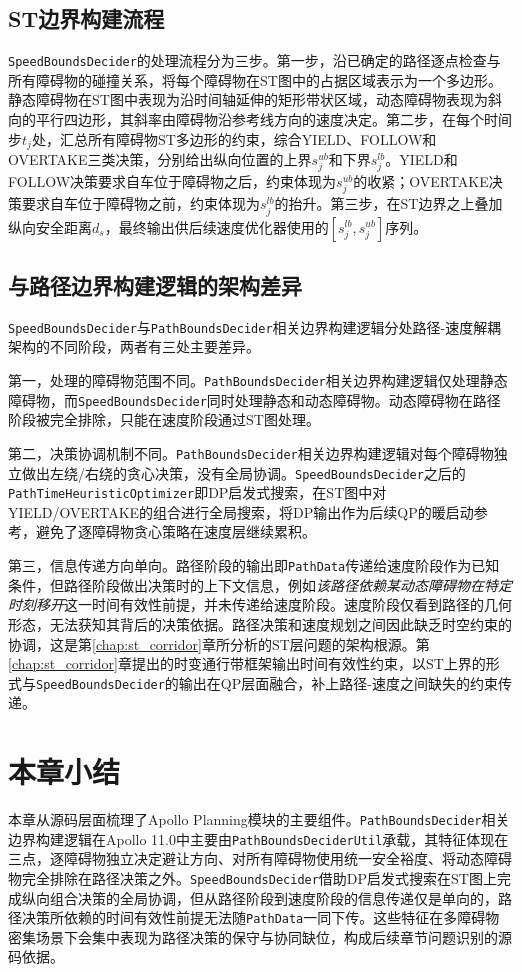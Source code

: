 \subsection{ST边界构建流程}

\texttt{SpeedBoundsDecider}的处理流程分为三步。第一步，沿已确定的路径逐点检查与所有障碍物的碰撞关系，将每个障碍物在ST图中的占据区域表示为一个多边形。静态障碍物在ST图中表现为沿时间轴延伸的矩形带状区域，动态障碍物表现为斜向的平行四边形，其斜率由障碍物沿参考线方向的速度决定。第二步，在每个时间步$t_j$处，汇总所有障碍物ST多边形的约束，综合YIELD、FOLLOW和OVERTAKE三类决策，分别给出纵向位置的上界$s_j^{ub}$和下界$s_j^{lb}$。YIELD和FOLLOW决策要求自车位于障碍物之后，约束体现为$s_j^{ub}$的收紧；OVERTAKE决策要求自车位于障碍物之前，约束体现为$s_j^{lb}$的抬升。第三步，在ST边界之上叠加纵向安全距离$d_s$，最终输出供后续速度优化器使用的$[s_j^{lb}, s_j^{ub}]$序列。

\subsection{与路径边界构建逻辑的架构差异}

\texttt{SpeedBoundsDecider}与\texttt{PathBoundsDecider}相关边界构建逻辑分处路径-速度解耦架构的不同阶段，两者有三处主要差异。

第一，处理的障碍物范围不同。\texttt{PathBoundsDecider}相关边界构建逻辑仅处理静态障碍物，而\texttt{SpeedBoundsDecider}同时处理静态和动态障碍物。动态障碍物在路径阶段被完全排除，只能在速度阶段通过ST图处理。

第二，决策协调机制不同。\texttt{PathBoundsDecider}相关边界构建逻辑对每个障碍物独立做出左绕/右绕的贪心决策，没有全局协调。\texttt{SpeedBoundsDecider}之后的\texttt{PathTimeHeuristicOptimizer}即DP启发式搜索，在ST图中对YIELD/OVERTAKE的组合进行全局搜索，将DP输出作为后续QP的暖启动参考，避免了逐障碍物贪心策略在速度层继续累积。

第三，信息传递方向单向。路径阶段的输出即\texttt{PathData}传递给速度阶段作为已知条件，但路径阶段做出决策时的上下文信息，例如\emph{该路径依赖某动态障碍物在特定时刻移开}这一时间有效性前提，并未传递给速度阶段。速度阶段仅看到路径的几何形态，无法获知其背后的决策依据。路径决策和速度规划之间因此缺乏时空约束的协调，这是第\ref{chap:st_corridor}章所分析的ST层问题的架构根源。第\ref{chap:st_corridor}章提出的时变通行带框架输出时间有效性约束，以ST上界的形式与\texttt{SpeedBoundsDecider}的输出在QP层面融合，补上路径-速度之间缺失的约束传递。

\section{本章小结}

本章从源码层面梳理了Apollo Planning模块的主要组件。\texttt{PathBoundsDecider}相关边界构建逻辑在Apollo 11.0中主要由\texttt{PathBoundsDeciderUtil}承载，其特征体现在三点，逐障碍物独立决定避让方向、对所有障碍物使用统一安全裕度、将动态障碍物完全排除在路径决策之外。\texttt{SpeedBoundsDecider}借助DP启发式搜索在ST图上完成纵向组合决策的全局协调，但从路径阶段到速度阶段的信息传递仅是单向的，路径决策所依赖的时间有效性前提无法随\texttt{PathData}一同下传。这些特征在多障碍物密集场景下会集中表现为路径决策的保守与协同缺位，构成后续章节问题识别的源码依据。
